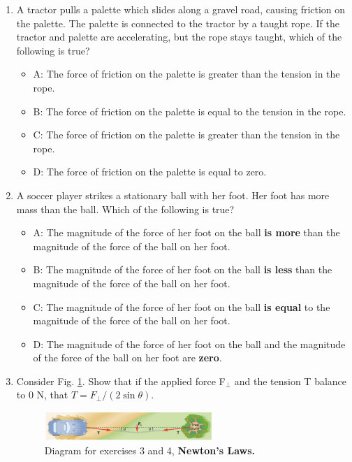 \documentclass[10pt]{article}
\begin{document}
\begin{enumerate}
\begin{itemize}
\end{itemize}
\item A tractor pulls a palette which slides along a gravel road, causing friction on the palette.  The palette is connected to the tractor by a taught rope.  If the tractor and palette are accelerating, but the rope stays taught, which of the following is true?
\begin{itemize}
\item A: The force of friction on the palette is greater than the tension in the rope.
\item B: The force of friction on the palette is equal to the tension in the rope.
\item C: The force of friction on the palette is greater than the tension in the rope.
\item D: The force of friction on the palette is equal to zero.
\end{itemize}
\item A soccer player strikes a stationary ball with her foot.  Her foot has more mass than the ball.  Which of the following is true?
\begin{itemize}
\item A: The magnitude of the force of her foot on the ball \textbf{is more} than the magnitude of the force of the ball on her foot.
\item B: The magnitude of the force of her foot on the ball \textbf{is less} than the magnitude of the force of the ball on her foot.
\item C: The magnitude of the force of her foot on the ball \textbf{is equal} to the magnitude of the force of the ball on her foot.
\item D: The magnitude of the force of her foot on the ball and the magnitude of the force of the ball on her foot are \textbf{zero}.
\end{itemize}
\clearpage
\item Consider Fig. \ref{fig:car_pull}.  Show that if the applied force F$_{\perp}$ and the tension T balance to 0 N, that $T = F_{\perp}/(2\sin\theta)$. \vspace{2.5cm}
\begin{figure}
\centering
\includegraphics[width=0.6\textwidth]{figures/carpull.png}
\caption{\label{fig:car_pull} Diagram for exercises 3 and 4, \textbf{Newton's Laws.}}
\end{figure}

\end{enumerate}
\end{document}
